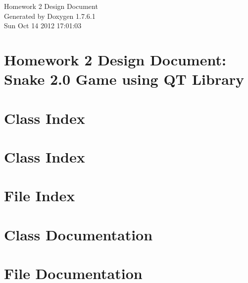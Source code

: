 \documentclass[a4paper]{book}
\begin{document}
\hypersetup{pageanchor=false,citecolor=blue}
\begin{titlepage}
\vspace*{7cm}
\begin{center}
{\Large \-Homework 2 \-Design \-Document }\\
\vspace*{1cm}
{\large \-Generated by Doxygen 1.7.6.1}\\
\vspace*{0.5cm}
{\small Sun Oct 14 2012 17:01:03}\\
\end{center}
\end{titlepage}
\clearemptydoublepage
{}
\tableofcontents
\clearemptydoublepage
{}
\hypersetup{pageanchor=true,citecolor=blue}
\chapter{\-Homework 2 \-Design \-Document\-: \-Snake 2.0 \-Game using \-Q\-T \-Library}
\label{index}\hypertarget{index}{}
\chapter{\-Class \-Index}

\chapter{\-Class \-Index}

\chapter{\-File \-Index}

\chapter{\-Class \-Documentation}







\chapter{\-File \-Documentation}
















\printindex
\end{document}
